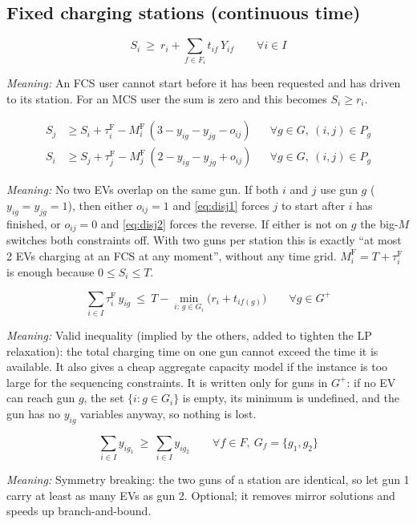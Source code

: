 \documentclass[12pt,a4paper]{article}
\newcommand{\mdesc}[1]{\par{\textit{Meaning:} #1}\par}
\begin{document}
\subsection{Fixed charging stations (continuous time)}
\begin{equation}
S_i\ \ge\ r_i+\sum_{f\in F_i}t_{if}\,Y_{if}\qquad\forall i\in I \label{eq:fcsarr}
\end{equation}
\mdesc{An FCS user cannot start before it has been requested and has driven to its station. For an MCS user the sum is zero and this becomes $S_i\ge r_i$.}

\begin{align}
S_j &\ge S_i+\tau^{\mathrm F}_i-M^{\mathrm F}_i\,(3-y_{ig}-y_{jg}-o_{ij}) && \forall g\in G,\ (i,j)\in P_g \label{eq:disj1}\\
S_i &\ge S_j+\tau^{\mathrm F}_j-M^{\mathrm F}_j\,(2-y_{ig}-y_{jg}+o_{ij}) && \forall g\in G,\ (i,j)\in P_g \label{eq:disj2}
\end{align}
\mdesc{No two EVs overlap on the same gun. If both $i$ and $j$ use gun $g$ ($y_{ig}=y_{jg}=1$), then either $o_{ij}=1$ and \eqref{eq:disj1} forces $j$ to start after $i$ has finished, or $o_{ij}=0$ and \eqref{eq:disj2} forces the reverse. If either is not on $g$ the big-$M$ switches both constraints off. With two guns per station this is exactly ``at most 2 EVs charging at an FCS at any moment'', without any time grid. $M^{\mathrm F}_i=T+\tau^{\mathrm F}_i$ is enough because $0\le S_i\le T$.}

\begin{equation}
\sum_{i\in I}\tau^{\mathrm F}_i\,y_{ig}\ \le\ T-\min_{i:\,g\in G_i}\Big(r_i+t_{if(g)}\Big)\qquad\forall g\in G^{+} \label{eq:gunload}
\end{equation}
\mdesc{Valid inequality (implied by the others, added to tighten the LP relaxation): the total charging time on one gun cannot exceed the time it is available. It also gives a cheap aggregate capacity model if the instance is too large for the sequencing constraints. It is written only for guns in $G^{+}$: if no EV can reach gun $g$, the set $\{i: g\in G_i\}$ is empty, its minimum is undefined, and the gun has no $y_{ig}$ variables anyway, so nothing is lost.}


\begin{equation}
\sum_{i\in I}y_{ig_1}\ \ge\ \sum_{i\in I}y_{ig_2}\qquad\forall f\in F,\ G_f=\{g_1,g_2\} \label{eq:gunsym}
\end{equation}
\mdesc{Symmetry breaking: the two guns of a station are identical, so let gun 1 carry at least as many EVs as gun 2. Optional; it removes mirror solutions and speeds up branch-and-bound.}
\end{document}
